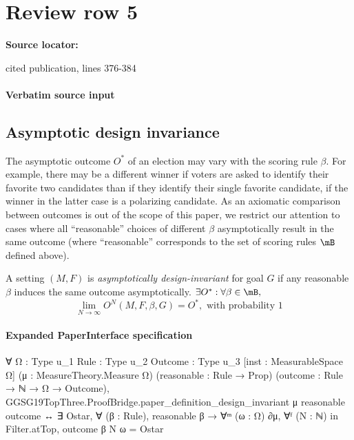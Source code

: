 \documentclass[10pt]{article}
\begin{document}
\section*{Review row 5}
\textbf{Source locator:} {\footnotesize\raggedright cited publication, lines 376-\allowbreak{}384\par}
\paragraph{Verbatim source input}
\begin{ReviewVerbatim}
\subsection{Asymptotic design invariance}
\label{sec:consistency}
The asymptotic outcome $O^*$ of an election may vary with the scoring rule $\beta$. For example, there may be a different winner if voters are asked to identify their favorite two candidates than if they identify their single favorite candidate, if the winner in the latter case is a polarizing candidate. As an axiomatic comparison between outcomes is out of the scope of this paper, we restrict our attention to cases where all ``reasonable'' choices of different $\beta$ asymptotically result in the same outcome (where ``reasonable'' corresponds to the set of scoring rules $\mB$ defined above).


\begin{definition}
	A setting $(M, F)$ is \textit{asymptotically design-invariant} for goal $G$ if any reasonable $\beta$ induces the same outcome asymptotically. $\exists O^*: \forall \beta \in \mB,$
	\[ \lim_{N \to \infty} O^N(M, F, \beta, G) = O^*, \text{ with probability } 1 \]
\end{definition}
\end{ReviewVerbatim}


\paragraph{Expanded PaperInterface specification}
\begin{ReviewVerbatim}
∀ {Ω : Type u_1} {Rule : Type u_2} {Outcome : Type u_3} [inst : MeasurableSpace Ω] (μ : MeasureTheory.Measure Ω)
  (reasonable : Rule → Prop) (outcome : Rule → ℕ → Ω → Outcome),
  GGSG19TopThree.ProofBridge.paper_definition_design_invariant μ reasonable outcome ↔
    ∃ Ostar, ∀ (β : Rule), reasonable β → ∀ᵐ (ω : Ω) ∂μ, ∀ᶠ (N : ℕ) in Filter.atTop, outcome β N ω = Ostar
\end{ReviewVerbatim}
\end{document}
